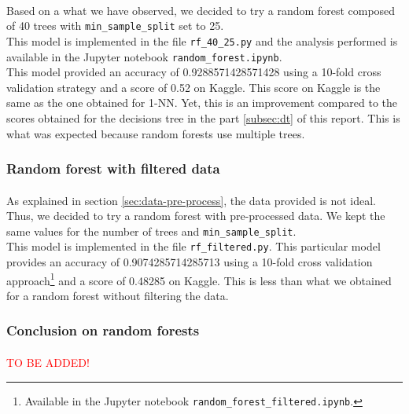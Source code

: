 \documentclass[a4paper, 11pt, oneside]{article}
\begin{document}
\paragraph{}Based on a what we have observed, we decided to try a random forest composed of 40 trees with \texttt{min\_sample\_split} set to 25.\\
This model is implemented in the file \texttt{rf\_40\_25.py} and the analysis performed is available in the Jupyter notebook \texttt{random\_forest.ipynb}.\\
This model provided an accuracy of 0.9288571428571428 using a 10-fold cross validation strategy and a score of 0.52 on Kaggle. This score on Kaggle is the same as the one obtained for 1-NN. Yet, this is an improvement compared to the scores obtained for the decisions tree in the part \ref{subsec:dt} of this report. This is what was expected because random forests use multiple trees.

\subsubsection{Random forest with filtered data} \label{subsubsec:rfFiltered}
\paragraph{}As explained in section \ref{sec:data-pre-process}, the data provided is not ideal. Thus, we decided to try a random forest with pre-processed data. We kept the same values for the number of trees and \texttt{min\_sample\_split}.\\
This model is implemented in the file \texttt{rf\_filtered.py}. This particular model provides an accuracy of 0.9074285714285713 using a 10-fold cross validation approach\footnote{Available in the Jupyter notebook \texttt{random\_forest\_filtered.ipynb}.} and a score of 0.48285 on Kaggle. This is less than what we obtained for a random forest without filtering the data.

\subsubsection{Conclusion on random forests}
\paragraph{}\textcolor{red}{TO BE ADDED!}

\end{document}
